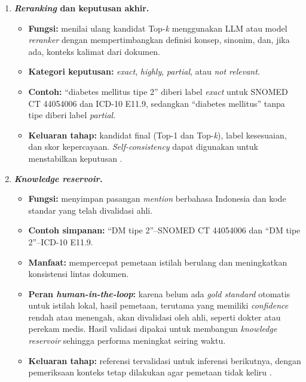 \begin{enumerate}
    \item \textbf{\textit{Reranking} dan keputusan akhir.}
    \begin{itemize}
        \item \textbf{Fungsi:} menilai ulang kandidat Top-\textit{k} menggunakan LLM atau model \textit{reranker} dengan mempertimbangkan definisi konsep, sinonim, dan, jika ada, konteks kalimat dari dokumen.
        \item \textbf{Kategori keputusan:} \textit{exact}, \textit{highly}, \textit{partial}, atau \textit{not relevant}.
        \item \textbf{Contoh:} ``diabetes mellitus tipe 2'' diberi label \textit{exact} untuk SNOMED CT 44054006 dan ICD-10 E11.9, sedangkan ``diabetes mellitus'' tanpa tipe diberi label \textit{partial}.
        \item \textbf{Keluaran tahap:} kandidat final (Top-1 dan Top-\textit{k}), label kesesuaian, dan skor kepercayaan. \textit{Self-consistency} dapat digunakan untuk menstabilkan keputusan \citep{gilani_cde-mapper_2025}.
    \end{itemize}

    \item \textbf{\textit{Knowledge reservoir}.}
    \begin{itemize}
        \item \textbf{Fungsi:} menyimpan pasangan \textit{mention} berbahasa Indonesia dan kode standar yang telah divalidasi ahli.
        \item \textbf{Contoh simpanan:} ``DM tipe 2''--SNOMED CT 44054006 dan ``DM tipe 2''--ICD-10 E11.9.
        \item \textbf{Manfaat:} mempercepat pemetaan istilah berulang dan meningkatkan konsistensi lintas dokumen.
        \item \textbf{Peran \textit{human-in-the-loop}:} karena belum ada \textit{gold standard} otomatis untuk istilah lokal, hasil pemetaan, terutama yang memiliki \textit{confidence} rendah atau menengah, akan divalidasi oleh ahli, seperti dokter atau perekam medis. Hasil validasi dipakai untuk membangun \textit{knowledge reservoir} sehingga performa meningkat seiring waktu.
        \item \textbf{Keluaran tahap:} referensi tervalidasi untuk inferensi berikutnya, dengan pemeriksaan konteks tetap dilakukan agar pemetaan tidak keliru \citep{gilani_cde-mapper_2025}.
    \end{itemize}
\end{enumerate}

